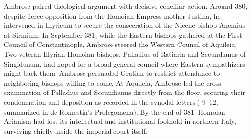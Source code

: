Ambrose paired theological argument with decisive conciliar action. Around 380, despite fierce opposition from the Homoian Empress-mother Justina, he intervened in Illyricum to secure the consecration of the Nicene bishop Anemius at Sirmium. In September 381, while the Eastern bishops gathered at the First Council of Constantinople, Ambrose steered the Western Council of Aquileia. Two veteran Illyrian Homoian bishops, Palladius of Ratiaria and Secundianus of Singidunum, had hoped for a broad general council where Eastern sympathizers might back them; Ambrose persuaded Gratian to restrict attendance to neighboring bishops willing to come. At Aquileia, Ambrose led the cross-examination of Palladius and Secundianus directly from the floor, securing their condemnation and deposition as recorded in the synodal letters ( 9--12, summarized in de Romestin's Prolegomena). By the end of 381, Homoian Arianism had lost its intellectual and institutional foothold in northern Italy, surviving chiefly inside the imperial court itself.
